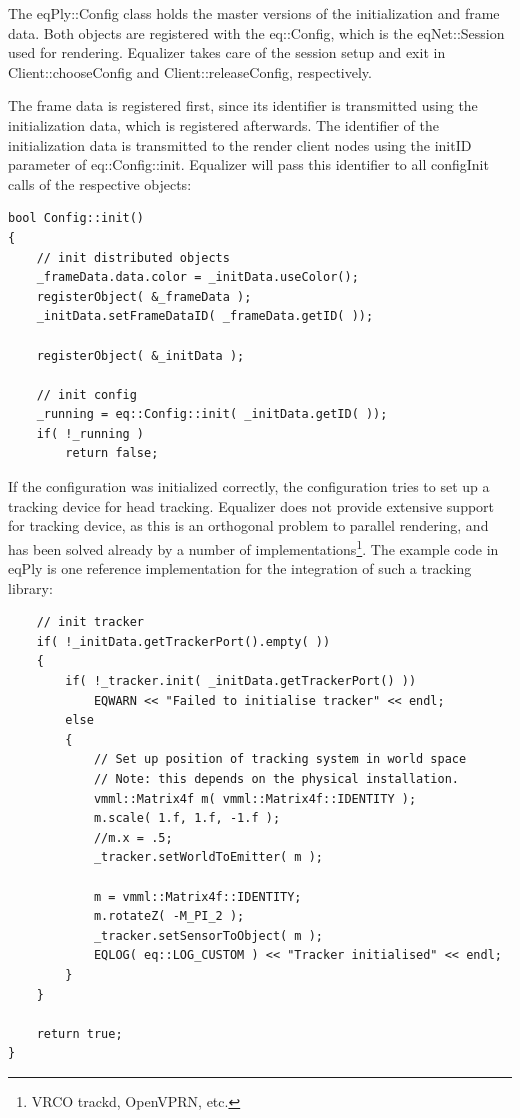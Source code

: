 \documentclass[10pt,a4]{scrartcl}
\begin{document}
The \textsf{eqPly::Config} class holds the master versions of the
initialization and frame data. Both objects are registered with the
\textsf{eq::Config}, which is the \textsf{eqNet::Session} used for
rendering. Equalizer takes care of the session setup and exit in
\textsf{Client::choose\-Config} and \textsf{Client::releaseConfig},
respectively.

The frame data is registered first, since its identifier is transmitted
using the initialization data, which is registered afterwards. The
identifier of the initialization data is transmitted to the render
client nodes using the \textsf{initID} parameter of
\textsf{eq::Config::init}. Equalizer will pass this identifier to all
\textsf{configInit} calls of the respective objects:

{\footnotesize\begin{lstlisting}
bool Config::init()
{
    // init distributed objects
    _frameData.data.color = _initData.useColor();
    registerObject( &_frameData );
    _initData.setFrameDataID( _frameData.getID( ));

    registerObject( &_initData );

    // init config
    _running = eq::Config::init( _initData.getID( ));
    if( !_running )
        return false;
\end{lstlisting}}

If the configuration was initialized correctly, the configuration tries
to set up a tracking device for head tracking. Equalizer does not
provide extensive support for tracking device, as this is an orthogonal
problem to parallel rendering, and has been solved already by a number
of implementations\footnote{VRCO trackd, OpenVPRN, etc.}. The example
code in \textsf{eqPly} is one reference implementation for the
integration of such a tracking library:

{\footnotesize\begin{lstlisting}
    // init tracker
    if( !_initData.getTrackerPort().empty( ))
    {
        if( !_tracker.init( _initData.getTrackerPort() ))
            EQWARN << "Failed to initialise tracker" << endl;
        else
        {
            // Set up position of tracking system in world space
            // Note: this depends on the physical installation.
            vmml::Matrix4f m( vmml::Matrix4f::IDENTITY );
            m.scale( 1.f, 1.f, -1.f );
            //m.x = .5;
            _tracker.setWorldToEmitter( m );

            m = vmml::Matrix4f::IDENTITY;
            m.rotateZ( -M_PI_2 );
            _tracker.setSensorToObject( m );
            EQLOG( eq::LOG_CUSTOM ) << "Tracker initialised" << endl;
        }
    }

    return true;
}
\end{lstlisting}}%
\end{document}
